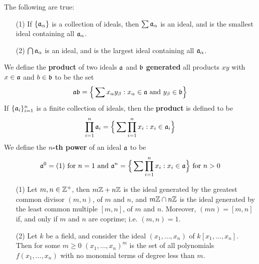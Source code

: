 \begin{lemma}\label{lemma_1.10.2}
  The following are true:
  \begin{enumerate}
    \item[(1)] If $\{\af_\a\}$ is a collection of ideals, then $\sum{\af_\a}$ is
      an ideal, and is the smallest ideal containing all $\af_\a$.

    \item[(2)] $\bigcap{\af_\a}$ is an ideal, and is the largest ideal
      containing all $\af_\a$.
  \end{enumerate}
\end{lemma}

\begin{definition}
  We define the \textbf{product} of two ideals $\af$ and $\bf$
  \textbf{generated} all products $xy$ with $x \in \af$ and $b \in \bf$ to be
  the set
  \begin{equation*}
    \af\bf=
    \Big{\{} \sum{x_\a y_\b} : x_\a \in \af \text{ and } y_\b \in \bf \Big{\}}
  \end{equation*}
  If $\{\af_i\}_{i=1}^n$ is a finite collection of ideals, then the
  \textbf{product} is defined to be
  \begin{equation*}
    \prod_{i=1}^{n}{\af_i}=
    \Big{\{} \sum{\prod_{i=1}^n{x_i}} : x_i \in \af_i \Big{\}}
  \end{equation*}
  We define the \textbf{$n$-th power} of an ideal $\af$ to be
  \begin{equation*}
    \af^0=(1) \text{ for } n=1 \text{ and }
    \af^n=\Big{\{} \sum{\prod_{i=1}^n{x_i}} : x_i \in \af  \Big{\}}
    \text{ for } n>0
  \end{equation*}
\end{definition}

\begin{example}\label{example_1.14}
  \begin{enumerate}
    \item[(1)] Let $m,n \in \Z^+$, then $m\Z+n\Z$ is the ideal generated by
      the greatest common divisor $(m,n)$, of $m$ and $n$, and $m\Z \cap n\Z$
      is the ideal generated by the least common multiple $[m,n]$, of $m$ and
      $n$. Moreover, $(mn)=[m,n]$ if, and only if $m$ and $n$ are coprime; i.e.
      $(m,n)=1$.

    \item[(2)] Let $k$ be a field, and consider the ideal $(x_1, \dots, x_n)$ of
      $k[x_1, \dots, x_n]$. Then for some $m \geq 0$ $(x_1, \dots, x_n)^m$ is
      the set of all polynomials $f(x_1, \dots, x_n)$ with no monomial terms of
      degree less than $m$.
  \end{enumerate}
\end{example}

